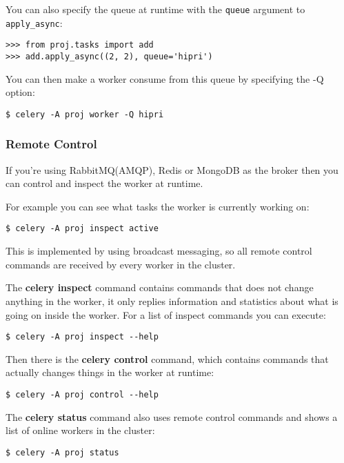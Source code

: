 \documentclass[9pt,a4paper]{article}
\begin{document}
\begin{CJK*}{GBK}{kai}
You can also specify the queue at runtime with the \verb"queue" argument to \verb"apply_async":

\begin{Verbatim}[frame=single]
>>> from proj.tasks import add
>>> add.apply_async((2, 2), queue='hipri')
\end{Verbatim}

You can then make a worker consume from this queue by specifying the -Q option:

\begin{Verbatim}[frame=single]
$ celery -A proj worker -Q hipri
\end{Verbatim}

\subsubsection{Remote Control}
If you\textquoteright re using RabbitMQ(AMQP), Redis or MongoDB as the broker then you can control and inspect the worker at runtime.

For example you can see what tasks the worker is currently working on:

\begin{Verbatim}[frame=single]
$ celery -A proj inspect active
\end{Verbatim}

This is implemented by using broadcast messaging, so all remote control commands are received by every worker in the cluster.

The \textbf{celery inspect} command contains commands that does not change anything in the worker, it only replies information and statistics about what is going on inside the worker. For a list of inspect commands you can execute:

\begin{Verbatim}[frame=single]
$ celery -A proj inspect --help
\end{Verbatim}

Then there is the \textbf{celery control} command, which contains commands that actually changes things in the worker at runtime:

\begin{Verbatim}[frame=single]
$ celery -A proj control --help
\end{Verbatim}

The \textbf{celery status} command also uses remote control commands and shows a list of online workers in the cluster:

\begin{Verbatim}[frame=single]
$ celery -A proj status
\end{Verbatim}


\end{CJK*}
\end{document}
